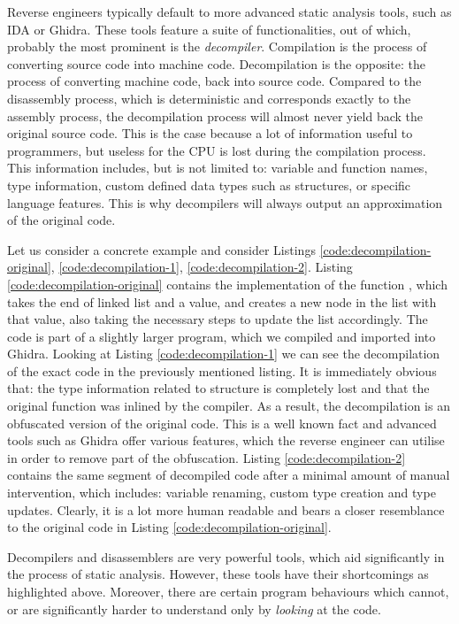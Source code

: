 Reverse engineers typically default to more advanced static analysis tools, such as IDA or Ghidra. These tools feature a suite of functionalities, out of which, probably the most prominent is the \emph{decompiler}. Compilation is the process of converting source code into machine code. Decompilation is the opposite: the process of converting machine code, back into source code. Compared to the disassembly process, which is deterministic and corresponds exactly to the assembly process, the decompilation process will almost never yield back the original source code. This is the case because a lot of information useful to programmers, but useless for the \gls{CPU} is lost during the compilation process. This information includes, but is not limited to: variable and function names, type information, custom defined data types such as structures, or specific language features. This is why decompilers will always output an approximation of the original code. 

Let us consider a concrete example and consider Listings \ref{code:decompilation-original}, \ref{code:decompilation-1}, \ref{code:decompilation-2}. Listing \ref{code:decompilation-original} contains the implementation of the function , which takes the end of linked list and a value, and creates a new node in the list with that value, also taking the necessary steps to update the list accordingly. The code is part of a slightly larger  program, which we compiled and imported into Ghidra. Looking at Listing \ref{code:decompilation-1} we can see the decompilation of the exact code in the previously mentioned listing. It is immediately obvious that: the type information related to  structure is completely lost and that the original function was inlined by the compiler. As a result, the decompilation is an obfuscated version of the original code. This is a well known fact and advanced tools such as Ghidra offer various features, which the reverse engineer can utilise in order to remove part of the obfuscation. Listing \ref{code:decompilation-2} contains the same segment of decompiled code after a minimal amount of manual intervention, which includes: variable renaming, custom type creation and type updates. Clearly, it is a lot more human readable and bears a closer resemblance to the original code in Listing \ref{code:decompilation-original}. 

Decompilers and disassemblers are very powerful tools, which aid significantly in the process of static analysis. However, these tools have their shortcomings as highlighted above. Moreover, there are certain program behaviours which cannot, or are significantly harder to understand only by \emph{looking} at the code.


